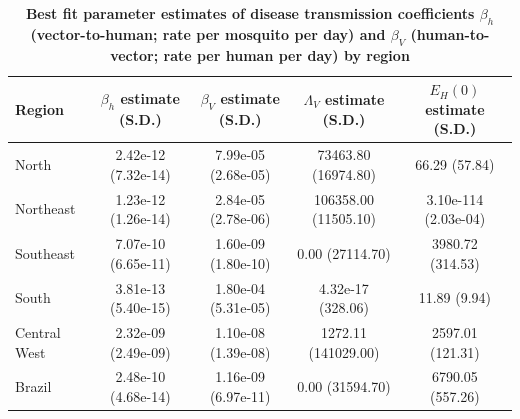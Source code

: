 \documentclass[10pt,letterpaper]{article}
\begin{document}
\begin{table}[!ht]
\begin{adjustwidth}{-2.25in}{0in}
    \centering
    \caption{\textbf{Best fit parameter estimates of disease transmission coefficients $\beta_h$ (vector-to-human; rate per mosquito per day) and $\beta_V$ (human-to-vector; rate per human per day) by region} }
    \begin{tabular}{|l|c|c|c|c|} \hline
     \textbf{Region }  &  \textbf{$\beta_h$ estimate (S.D.)} & \textbf{$\beta_V$ estimate (S.D.)} & \textbf{$\Lambda_V$ estimate (S.D.)} & \textbf{$E_H(0)$ estimate (S.D.)}\\ \hline
     North    & 2.42e-12 (7.32e-14) & 7.99e-05 (2.68e-05) & 73463.80 (16974.80) & 66.29 (57.84)\\\hline
     Northeast &1.23e-12 (1.26e-14) & 2.84e-05 (2.78e-06)& 106358.00 (11505.10) & 3.10e-114 (2.03e-04)\\\hline
     Southeast&7.07e-10 (6.65e-11) & 1.60e-09 (1.80e-10)& 0.00 (27114.70) & 3980.72 (314.53)\\\hline
     South& 3.81e-13 (5.40e-15)& 1.80e-04 (5.31e-05)& 4.32e-17 (328.06) & 11.89 (9.94)\\\hline
     Central West&2.32e-09 (2.49e-09)& 1.10e-08 (1.39e-08)& 1272.11 (141029.00) & 2597.01 (121.31)\\\hline \hline
     Brazil & 2.48e-10 (4.68e-14)& 1.16e-09 (6.97e-11)& 0.00 (31594.70) & 6790.05 (557.26)\\\hline
    \end{tabular}
     \begin{flushleft}
     \end{flushleft}
    
    \label{tab:zika_param_est}
    \end{adjustwidth}
\end{table}

         
\end{document}
